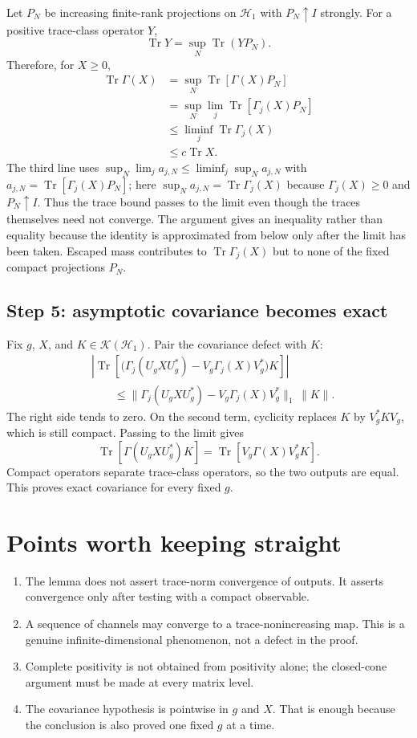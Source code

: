 \documentclass[11pt]{article}
\newcommand{\Hc}{\mathcal H}
\newcommand{\K}{\mathcal K}
\newcommand{\Tr}{\operatorname{Tr}}
\begin{document}
Let $P_N$ be increasing finite-rank projections on $\Hc_1$ with
$P_N\uparrow I$ strongly.  For a positive trace-class operator $Y$,
\[
  \Tr Y=\sup_N\Tr(YP_N).
\]
Therefore, for $X\geq0$,
\begin{align*}
  \Tr\Gamma(X)
  &=\sup_N\Tr[\Gamma(X)P_N]\\
  &=\sup_N\lim_j\Tr[\Gamma_j(X)P_N]\\
  &\leq\liminf_j\Tr\Gamma_j(X)\\
  &\leq c\Tr X.
\end{align*}
The third line uses
$\sup_N\lim_j a_{j,N}\leq\liminf_j\sup_N a_{j,N}$ with
$a_{j,N}=\Tr[\Gamma_j(X)P_N]$; here
$\sup_N a_{j,N}=\Tr\Gamma_j(X)$ because $\Gamma_j(X)\geq0$ and
$P_N\uparrow I$.  Thus the trace bound passes to the limit even though the
traces themselves need not converge.
The argument gives an inequality rather than equality because the identity
is approximated from below only after the limit has been taken.  Escaped
mass contributes to $\Tr\Gamma_j(X)$ but to none of the fixed compact
projections $P_N$.

\subsection*{Step 5: asymptotic covariance becomes exact}

Fix $g$, $X$, and $K\in\K(\Hc_1)$.  Pair the covariance defect with $K$:
\begin{align*}
 &\left|\Tr\left[
   \bigl(\Gamma_j(U_gXU_g^*)-V_g\Gamma_j(X)V_g^*\bigr)K
  \right]\right|\\
 &\qquad\leq
 \|\Gamma_j(U_gXU_g^*)-V_g\Gamma_j(X)V_g^*\|_1\,\|K\|.
\end{align*}
The right side tends to zero.  On the second term, cyclicity replaces $K$
by $V_g^*KV_g$, which is still compact.  Passing to the limit gives
\[
  \Tr[\Gamma(U_gXU_g^*)K]
  =\Tr[V_g\Gamma(X)V_g^*K].
\]
Compact operators separate trace-class operators, so the two outputs are
equal.  This proves exact covariance for every fixed $g$.

\section{Points worth keeping straight}

\begin{enumerate}
  \item The lemma does not assert trace-norm convergence of outputs.  It
  asserts convergence only after testing with a compact observable.
  \item A sequence of channels may converge to a trace-nonincreasing map.
  This is a genuine infinite-dimensional phenomenon, not a defect in the
  proof.
  \item Complete positivity is not obtained from positivity alone; the
  closed-cone argument must be made at every matrix level.
  \item The covariance hypothesis is pointwise in $g$ and $X$.  That is
  enough because the conclusion is also proved one fixed $g$ at a time.
\end{enumerate}
\end{document}
